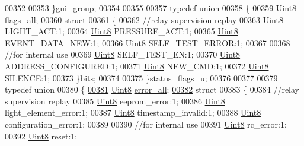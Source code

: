 \begin{DoxyCode}
00352     
00353 \}\hyperlink{a00001_d9/da4/a00078}{gui\_group};
00354 
00355 
\hypertarget{a00001_source_l00357}{}\hyperlink{a00001}{00357} \textcolor{keyword}{typedef} \textcolor{keyword}{union}
00358 \{
\hypertarget{a00001_source_l00359}{}\hyperlink{a00001_a2d5067795eb39162534e06fa9f6ac76c}{00359}     \hyperlink{a00001_a979e3e23b9a449e69ab6a8a83b6042f8}{Uint8} \hyperlink{a00001_a2d5067795eb39162534e06fa9f6ac76c}{flags\_all};
\hypertarget{a00001_source_l00360}{}\hyperlink{a00001}{00360}     \textcolor{keyword}{struct}
00361     \{
00362         \textcolor{comment}{//relay supervision replay}
00363         \hyperlink{a00001_a979e3e23b9a449e69ab6a8a83b6042f8}{Uint8} LIGHT\_ACT:1;
00364         \hyperlink{a00001_a979e3e23b9a449e69ab6a8a83b6042f8}{Uint8} PRESSURE\_ACT:1;
00365         \hyperlink{a00001_a979e3e23b9a449e69ab6a8a83b6042f8}{Uint8} EVENT\_DATA\_NEW:1;
00366         \hyperlink{a00001_a979e3e23b9a449e69ab6a8a83b6042f8}{Uint8} SELF\_TEST\_ERROR:1;
00367 
00368         \textcolor{comment}{//for internal use}
00369         \hyperlink{a00001_a979e3e23b9a449e69ab6a8a83b6042f8}{Uint8} SELF\_TEST\_EN:1;
00370         \hyperlink{a00001_a979e3e23b9a449e69ab6a8a83b6042f8}{Uint8} ADDRESS\_CONFIGURED:1;
00371         \hyperlink{a00001_a979e3e23b9a449e69ab6a8a83b6042f8}{Uint8} NEW\_CMD:1;
00372         \hyperlink{a00001_a979e3e23b9a449e69ab6a8a83b6042f8}{Uint8} SILENCE:1;
00373     \}bits;
00374 
00375 \}\hyperlink{a00001_d0/de8/a00133}{status\_flags\_u};
00376 
00377 
\hypertarget{a00001_source_l00379}{}\hyperlink{a00001}{00379} \textcolor{keyword}{typedef} \textcolor{keyword}{union}
00380 \{
\hypertarget{a00001_source_l00381}{}\hyperlink{a00001_a5a1595d8eaf32825fc6cd8f7d5504231}{00381}     \hyperlink{a00001_a979e3e23b9a449e69ab6a8a83b6042f8}{Uint8} \hyperlink{a00001_a5a1595d8eaf32825fc6cd8f7d5504231}{error\_all};
\hypertarget{a00001_source_l00382}{}\hyperlink{a00001}{00382}     \textcolor{keyword}{struct}
00383     \{
00384         \textcolor{comment}{//relay supervision replay}
00385         \hyperlink{a00001_a979e3e23b9a449e69ab6a8a83b6042f8}{Uint8} eeprom\_error:1;
00386         \hyperlink{a00001_a979e3e23b9a449e69ab6a8a83b6042f8}{Uint8} light\_element\_error:1;
00387         \hyperlink{a00001_a979e3e23b9a449e69ab6a8a83b6042f8}{Uint8} timestamp\_invalid:1;
00388         \hyperlink{a00001_a979e3e23b9a449e69ab6a8a83b6042f8}{Uint8} configuration\_error:1;
00389 
00390         \textcolor{comment}{//for internal use}
00391         \hyperlink{a00001_a979e3e23b9a449e69ab6a8a83b6042f8}{Uint8} rc\_error:1;
00392         \hyperlink{a00001_a979e3e23b9a449e69ab6a8a83b6042f8}{Uint8} reset:1;

\end{DoxyCode}
